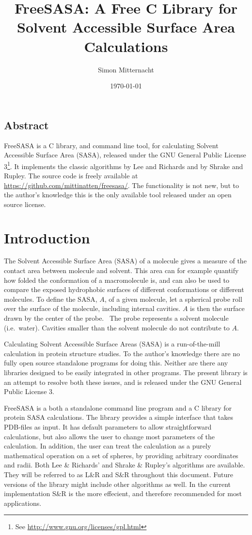 \documentclass[a4paper,11pt]{article}
\author{Simon Mitternacht}
\date{\today}
\title{FreeSASA: A Free C Library for Solvent Accessible Surface
  Area Calculations
}
\begin{document}
\maketitle

\subsection*{Abstract}
FreeSASA is a C library, and command line tool, for calculating
Solvent Accessible Surface Area (SASA), released under the GNU General
Public License 3\footnote{See
  \url{http://www.gnu.org/licenses/gpl.html}}. It implements the
classic algorithms by Lee and Richards and by Shrake and Rupley. The
source code is freely available at
\url{https://github.com/mittinatten/freesasa/}.  The functionality is
not new, but to the author's knowledge this is the only available tool
released under an open source license.

\section{Introduction}
The Solvent Accessible Surface Area (SASA) of a molecule gives a
measure of the contact area between molecule and solvent. This
area can for example quantify how folded the conformation of a
macromolecule is, and can also be used to compare the exposed
hydrophobic surfaces of different conformations or different
molecules. To define the SASA, $A$, of a given molecule, let a
spherical probe roll over the surface of the molecule, including
internal cavities. $A$ is then the surface drawn by the center of the
probe.~\cite{LnR} The probe represents a solvent molecule
(i.e.\ water). Cavities smaller than the solvent molecule do not
contribute to $A$.

Calculating Solvent Accessible Surface Areas (SASA) is a
run-of-the-mill calculation in protein structure studies. To the
author's knowledge there are no fully open source standalone programs
for doing this. Neither are there any libraries designed to be easily
integrated in other programs. The present library is an attempt to
resolve both these issues, and is released under the GNU General
Public License 3.

FreeSASA is a both a standalone command line program and a C library
for protein SASA calculations. The library provides a simple interface
that takes PDB-files as input. It has default parameters to allow
straightforward calculations, but also allows the user to change most
parameters of the calculation. In addition, the user can treat the
calculation as a purely mathematical operation on a set of spheres, by
providing arbitrary coordinates and radii. Both Lee \& Richards'
\cite{LnR} and Shrake \& Rupley's \cite{SnR} algorithms are
available. They will be referred to as L\&R and S\&R throughout this
document. Future versions of the library might include other
algorithms as well. In the current implementation S\&R is the more
effecient, and therefore recommended for most applications.
\end{document}
